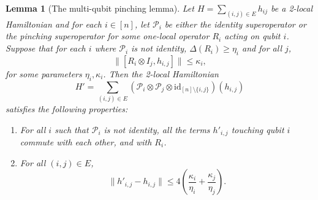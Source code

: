 \documentclass[a4paper,onecolumn,11pt]{quantumarticle}
\theoremstyle{plain}
\newtheorem{lemma}[theorem]{Lemma}
\renewcommand{\cP}{\mathcal{P}}
\begin{document}
\begin{lemma}[The multi-qubit pinching lemma]\label{lemma:double-extra-cheese}
    Let $H = \sum_{(i,j) \in E} h_{ij}$ be a 2-local Hamiltonian and for each $i \in [n]$, let $\mathcal{P}_i$ be either the identity superoperator or the pinching superoperator for some one-local operator $R_i$ acting on qubit $i$. Suppose that for each $i$ where $\mathcal{P}_i$ is not identity, $\Delta(R_i) \geq \eta_i$ and for all $j$, 
    \[ \|[R_i \otimes I_j, h_{i,j} ] \| \leq \kappa_i,\]
    for some parameters $\eta_i, \kappa_i$.
    Then the 2-local Hamiltonian
    \begin{equation}\label{eqn:definition-of-H-prime}
        H' = \sum_{(i,j) \in E} (\cP_i \otimes \cP_j \otimes \mathrm{id}_{[n]\setminus \{i,j\}})( h_{i,j})
    \end{equation}
    satisfies the following properties:
    \begin{enumerate}
        \item For all $i$ such that $\cP_i$ is not identity, all the terms $h'_{i,j}$ touching qubit $i$ commute with each other, and with $R_i$.
        \item For all $(i,j) \in E$,
        \begin{equation} \| h'_{i,j} - h_{i,j} \| \leq 4 \left(\frac{\kappa_i}{\eta_i} +  \frac{\kappa_j}{\eta_j}\right). \label{eq:cheese-rounding-error} \end{equation}
    \end{enumerate}
\end{lemma}
\end{document}
